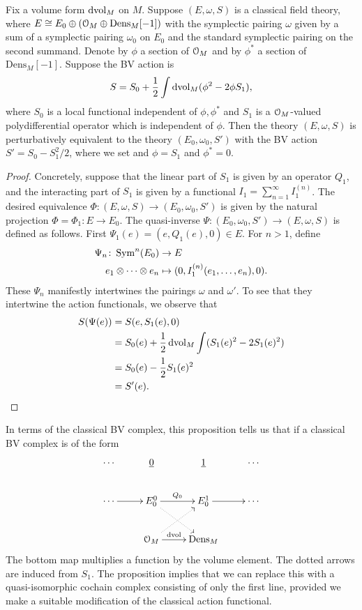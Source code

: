 \documentclass[10pt, oneside]{article}
\newcommand{\Dens}{\mathrm{Dens}}
\begin{document}
\begin{prop}\label{prop:integrateoutfield}
Fix a volume form $\operatorname{dvol}_M$ on $M$. Suppose $(E, \omega, S)$ is a classical field theory, where $E\cong E_0\oplus (\cO_M\oplus \Dens_M[-1])$ with the symplectic pairing $\omega$ given by a sum of a symplectic pairing $\omega_0$ on $E_0$ and the standard symplectic pairing on the second summand. Denote by $\phi$ a section of $\mathcal O_M$ and by $\phi^*$ a section of $\Dens_M[-1]$. Suppose the BV action is
\[S = S_0 + \frac{1}{2} \int \operatorname{dvol}_M (\phi^2 - 2\phi S_1),\]
where $S_0$ is a local functional independent of $\phi,\phi^*$ and $S_1$ is a $\mathcal O_M$-valued polydifferential operator which is independent of $\phi$. 
Then the theory $(E, \omega, S)$ is perturbatively equivalent to the theory $(E_0, \omega_0, S')$ with the BV action $S' = S_0 - S_1^2/2$, where we set and $\phi = S_1$ and $\phi^* = 0$.
\end{prop}
\begin{proof}
Concretely, suppose that the linear part of $S_1$ is given by an operator $Q_1$, and the interacting part of $S_1$ is given by a functional $I_1 = \sum_{n=1}^\infty I_1^{(n)}$.  
The desired equivalence $\Phi \colon (E, \omega, S) \to (E_0, \omega_0, S')$ is given by the natural projection $\Phi = \Phi_1 \colon E \to E_0$. 
The quasi-inverse $\Psi \colon (E_0, \omega_0, S') \to (E, \omega, S)$ is defined as follows.
First $\Psi_1(e) = (e, Q_1(e), 0) \in E$.
For $n > 1$, define
\begin{align*}
\Psi_n \colon \operatorname{Sym}^n(E_0) &\to E \\
e_1 \otimes \cdots \otimes e_n &\mapsto (0, I_1^{(n)}(e_1, \ldots, e_n), 0).
\end{align*}
These $\Psi_n$ manifestly intertwines the pairings $\omega$ and $\omega'$.  
To see that they intertwine the action functionals, we observe that 
\begin{align*}
S(\Psi(e)) &= S(e, S_1(e), 0) \\
&= S_0(e) + \frac 12 \operatorname{dvol}_M \int (S_1(e)^2 - 2 S_1(e)^2) \\
&= S_0(e) - \frac 12 S_1(e)^2 \\
&= S'(e).
\end{align*}
\end{proof}

\begin{remark}
In terms of the classical BV complex, this proposition tells us that if a classical BV complex is of the form
\[\xymatrix{
\cdots & \ul{0} & \ul{1} & \cdots \\
\cdots \ar[r] & E_0^0 \ar[r]^{Q_0} \ar@{.>}[dr] & E_0^1 \ar[r] &\cdots \\
&\cO_M \ar^-{{\rm dvol}}[r] \ar@{.>}[ur] &\dens_M &
}\]
The bottom map multiplies a function by the volume element.
The dotted arrows are induced from $S_1$.
The proposition implies that we can replace this with a quasi-isomorphic cochain complex consisting of only the first line, provided we make a suitable modification of the classical action functional. 
\end{remark}
\end{document}
